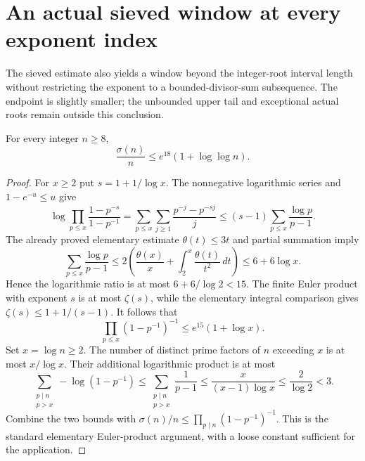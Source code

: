 \section{An actual sieved window at every exponent index}
\label{aw-section}

The sieved estimate also yields a window beyond the integer-root
interval length without restricting the exponent to a bounded-divisor-sum
subsequence. The endpoint is slightly smaller; the unbounded upper tail
and exceptional actual roots remain outside this conclusion.

\begin{lemma}\label{aw-sigma}
For every integer $n\ge8$,
\[
 \frac{\sigma(n)}n\le e^{18}(1+\log\log n).
\]
\end{lemma}
\begin{proof}
For $x\ge2$ put $s=1+1/\log x$. The nonnegative logarithmic series and
$1-e^{-u}\le u$ give
\[
 \log\prod_{p\le x}\frac{1-p^{-s}}{1-p^{-1}}
 =\sum_{p\le x}\sum_{j\ge1}\frac{p^{-j}-p^{-sj}}j
 \le(s-1)\sum_{p\le x}\frac{\log p}{p-1}.
\]
The already proved elementary estimate $\theta(t)\le3t$ and partial
summation imply
\[
 \sum_{p\le x}\frac{\log p}{p-1}
 \le2\left(\frac{\theta(x)}x+
               \int_2^x\frac{\theta(t)}{t^2}\,dt\right)
 \le6+6\log x.
\]
Hence the logarithmic ratio is at most $6+6/\log2<15$. The finite
Euler product with exponent $s$ is at most $\zeta(s)$, while the
elementary integral comparison gives $\zeta(s)\le1+1/(s-1)$.
It follows that
\[
 \prod_{p\le x}(1-p^{-1})^{-1}\le e^{15}(1+\log x).
\]
Set $x=\log n\ge2$. The number of distinct prime factors of $n$
exceeding $x$ is at most $x/\log x$. Their additional logarithmic
product is at most
\[
 \sum_{\substack{p\mid n\\p>x}}-\log(1-p^{-1})
 \le\sum_{\substack{p\mid n\\p>x}}\frac1{p-1}
 \le\frac{x}{(x-1)\log x}\le\frac2{\log2}<3.
\]
Combine the two bounds with
$\sigma(n)/n\le\prod_{p\mid n}(1-p^{-1})^{-1}$.
This is the standard elementary Euler-product argument, with a loose
constant sufficient for the application.
\end{proof}

